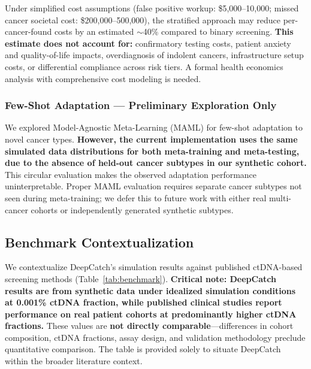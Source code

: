 \documentclass[10pt,a4paper]{article}
\begin{document}
Under simplified cost assumptions (false positive workup: \$5,000--10,000; missed cancer societal cost: \$200,000--500,000), the stratified approach may reduce per-cancer-found costs by an estimated $\sim$40\% compared to binary screening. \textbf{This estimate does not account for:} confirmatory testing costs, patient anxiety and quality-of-life impacts, overdiagnosis of indolent cancers, infrastructure setup costs, or differential compliance across risk tiers. A formal health economics analysis with comprehensive cost modeling is needed.

\subsubsection{Few-Shot Adaptation — Preliminary Exploration Only}

We explored Model-Agnostic Meta-Learning (MAML) for few-shot adaptation to novel cancer types. \textbf{However, the current implementation uses the same simulated data distributions for both meta-training and meta-testing, due to the absence of held-out cancer subtypes in our synthetic cohort.} This circular evaluation makes the observed adaptation performance uninterpretable. Proper MAML evaluation requires separate cancer subtypes not seen during meta-training; we defer this to future work with either real multi-cancer cohorts or independently generated synthetic subtypes.

\subsection{Benchmark Contextualization}

We contextualize DeepCatch's simulation results against published ctDNA-based screening methods (Table~\ref{tab:benchmark}). \textbf{Critical note: DeepCatch results are from synthetic data under idealized simulation conditions at 0.001\% ctDNA fraction, while published clinical studies report performance on real patient cohorts at predominantly higher ctDNA fractions.} These values are \textbf{not directly comparable}—differences in cohort composition, ctDNA fractions, assay design, and validation methodology preclude quantitative comparison. The table is provided solely to situate DeepCatch within the broader literature context.
\end{document}

